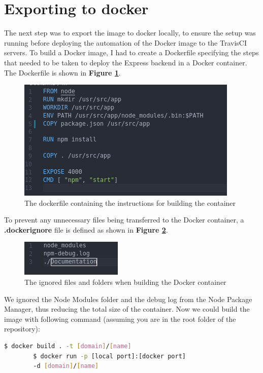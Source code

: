 \documentclass{paper}
\begin{document}
    \section{Exporting to docker}{
    The next step was to export the image to docker locally, to ensure the setup was
    running before deploying the automation of the Docker image to the TravisCI servers. To build a Docker image, I had to create
    a Dockerfile specifying the steps that needed to be taken to deploy the Express backend in a Docker container. The Dockerfile
    is shown in \textbf{Figure \ref{fig:dockerfile}}.
    \begin{figure}[!h]
        \centering
        \includegraphics[scale=3, pagebox=artbox]{Images/Dockerfile.png}
        \caption{The dockerfile containing the instructions for building the container}
        \label{fig:dockerfile}
    \end{figure}
    \newline
    To prevent any unnecessary files being transferred to the Docker container, a \textbf{.dockerignore} file is defined as shown in 
    \textbf{Figure \ref{fig:dockerignore}}.
    \begin{figure}[!h]
        \centering
        \includegraphics[scale=3, pagebox=artbox]{Images/dockerignore.png}
        \caption{The ignored files and folders when building the Docker container}
        \label{fig:dockerignore}
    \end{figure}
    \newline
    We ignored the Node Modules folder and the debug log from the Node Package Manager, thus reducing the total size of 
    the container. Now we could build the image with following command (assuming you are in the root folder of the repository):
    \begin{lstlisting}[language=bash]
        $ docker build . -t [domain]/[name]
        $ docker run -p [local port]:[docker port] 
        -d [domain]/[name]
    \end{lstlisting}
    }    
    \newpage
\end{document}
